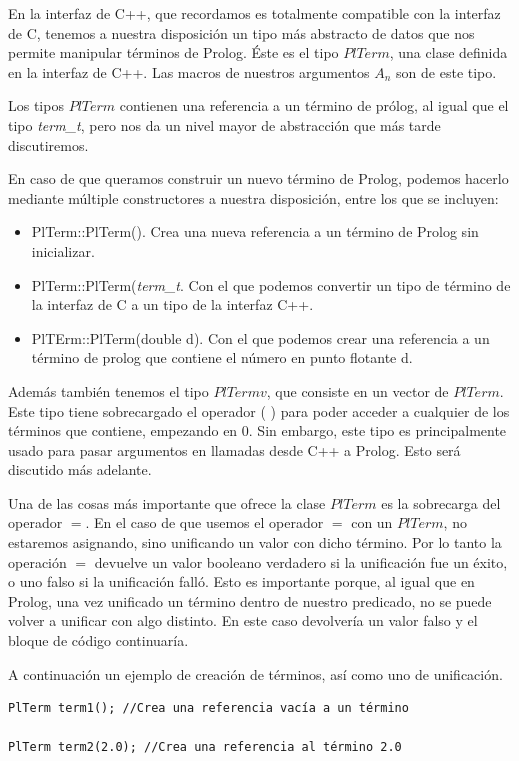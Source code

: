 \documentclass[a4paper]{article}
\begin{document}
En la interfaz de C++, que recordamos es totalmente compatible con la interfaz de C, tenemos a nuestra disposición un tipo más abstracto de datos que nos permite manipular términos de Prolog. Éste es el tipo $PlTerm$, una clase definida en la interfaz de C++. Las macros de nuestros argumentos $A_n$ son de este tipo.

Los tipos $PlTerm$ contienen una referencia a un término de prólog, al igual que el tipo \textit{term\_t}, pero nos da un nivel mayor de abstracción que más tarde discutiremos. 

En caso de que queramos construir un nuevo término de Prolog, podemos hacerlo mediante múltiple constructores a nuestra disposición, entre los que se incluyen:
\begin{itemize}
\item PlTerm::PlTerm(). Crea una nueva referencia a un término de Prolog sin inicializar.
\item PlTerm::PlTerm(\textit{term\_t}. Con el que podemos convertir un tipo de término de la interfaz de C a un tipo de la interfaz C++.
\item PlTErm::PlTerm(double d). Con el que podemos crear una referencia a un término de prolog que contiene el número en punto flotante d.
\end{itemize}

Además también tenemos el tipo $PlTermv$, que consiste en un vector de $PlTerm$. Este tipo tiene sobrecargado el operador ( ) para poder acceder a cualquier de los términos que contiene, empezando en 0. Sin embargo, este tipo es principalmente usado para pasar argumentos en llamadas desde C++ a Prolog. Esto será discutido más adelante.

Una de las cosas más importante que ofrece la clase $PlTerm$ es la sobrecarga del operador $=$. En el caso de que usemos el operador $=$ con un $PlTerm$, no estaremos asignando, sino unificando un valor con dicho término. Por lo tanto la operación $=$ devuelve un valor booleano verdadero si la unificación fue un éxito, o uno falso si la unificación falló. Esto es importante porque, al igual que en Prolog, una vez unificado un término dentro de nuestro predicado, no se puede volver a unificar con algo distinto. En este caso devolvería un valor falso y el bloque de código continuaría.

A continuación un ejemplo de creación de términos, así como uno de unificación.

\begin{lstlisting}[style=C++]
PlTerm term1(); //Crea una referencia vacía a un término

PlTerm term2(2.0); //Crea una referencia al término 2.0
\end{lstlisting}
\end{document}
